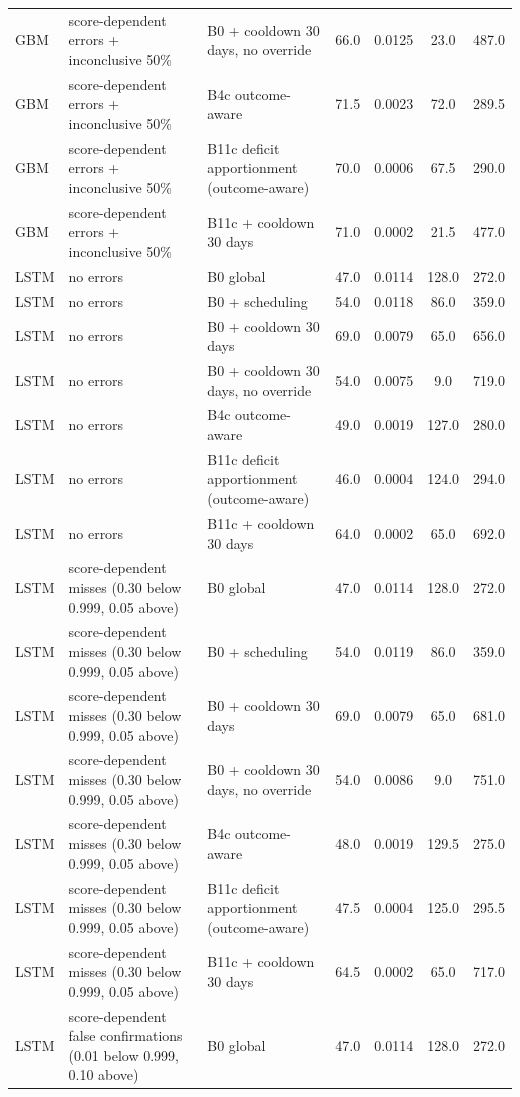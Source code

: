 \begin{longtable}{lp{5.2cm}p{4.4cm}cccc}
GBM & score-dependent errors + inconclusive 50\% & B0 + cooldown 30 days, no override & 66.0 & 0.0125 & 23.0 & 487.0 \\
GBM & score-dependent errors + inconclusive 50\% & B4c outcome-aware & 71.5 & 0.0023 & 72.0 & 289.5 \\
GBM & score-dependent errors + inconclusive 50\% & B11c deficit apportionment (outcome-aware) & 70.0 & 0.0006 & 67.5 & 290.0 \\
GBM & score-dependent errors + inconclusive 50\% & B11c + cooldown 30 days & 71.0 & 0.0002 & 21.5 & 477.0 \\
LSTM & no errors & B0 global & 47.0 & 0.0114 & 128.0 & 272.0 \\
LSTM & no errors & B0 + scheduling & 54.0 & 0.0118 & 86.0 & 359.0 \\
LSTM & no errors & B0 + cooldown 30 days & 69.0 & 0.0079 & 65.0 & 656.0 \\
LSTM & no errors & B0 + cooldown 30 days, no override & 54.0 & 0.0075 & 9.0 & 719.0 \\
LSTM & no errors & B4c outcome-aware & 49.0 & 0.0019 & 127.0 & 280.0 \\
LSTM & no errors & B11c deficit apportionment (outcome-aware) & 46.0 & 0.0004 & 124.0 & 294.0 \\
LSTM & no errors & B11c + cooldown 30 days & 64.0 & 0.0002 & 65.0 & 692.0 \\
LSTM & score-dependent misses (0.30 below 0.999, 0.05 above) & B0 global & 47.0 & 0.0114 & 128.0 & 272.0 \\
LSTM & score-dependent misses (0.30 below 0.999, 0.05 above) & B0 + scheduling & 54.0 & 0.0119 & 86.0 & 359.0 \\
LSTM & score-dependent misses (0.30 below 0.999, 0.05 above) & B0 + cooldown 30 days & 69.0 & 0.0079 & 65.0 & 681.0 \\
LSTM & score-dependent misses (0.30 below 0.999, 0.05 above) & B0 + cooldown 30 days, no override & 54.0 & 0.0086 & 9.0 & 751.0 \\
LSTM & score-dependent misses (0.30 below 0.999, 0.05 above) & B4c outcome-aware & 48.0 & 0.0019 & 129.5 & 275.0 \\
LSTM & score-dependent misses (0.30 below 0.999, 0.05 above) & B11c deficit apportionment (outcome-aware) & 47.5 & 0.0004 & 125.0 & 295.5 \\
LSTM & score-dependent misses (0.30 below 0.999, 0.05 above) & B11c + cooldown 30 days & 64.5 & 0.0002 & 65.0 & 717.0 \\
LSTM & score-dependent false confirmations (0.01 below 0.999, 0.10 above) & B0 global & 47.0 & 0.0114 & 128.0 & 272.0 \\

\end{longtable}
